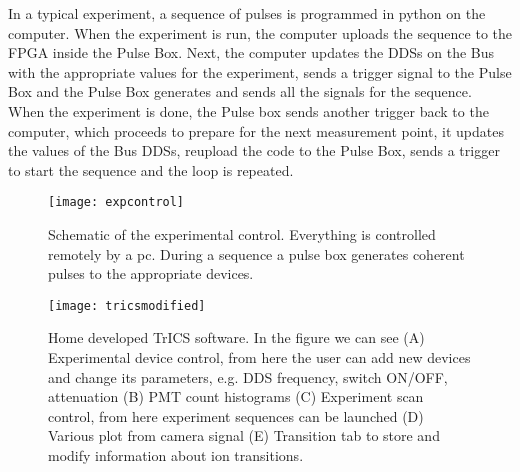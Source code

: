 In a typical experiment, a sequence of pulses is programmed in python on the computer. When the experiment is run, the computer uploads the sequence to the FPGA inside the Pulse Box. Next, the computer updates the DDSs on the Bus with the appropriate values for the experiment, sends a trigger signal to the Pulse Box and the Pulse Box generates and sends all the signals for the sequence. When the experiment is done, the Pulse box sends another trigger back to the computer, which proceeds to prepare for the next measurement point, it updates the values of the Bus DDSs, reupload the code to the Pulse Box, sends a trigger to start the sequence and the loop is repeated.

\begin{figure}
\centering
\texttt{[image: expcontrol]}
\caption{Schematic of the experimental control. Everything is controlled remotely by a pc. During a sequence a pulse box generates coherent pulses to the appropriate devices.}
\label{expcontrol}
\end{figure}

\begin{figure}
\centering
\texttt{[image: tricsmodified]}
\caption{Home developed TrICS software. In the figure we can see (A) Experimental device control, from here the user can add new devices and change its parameters, e.g. DDS frequency, switch ON/OFF, attenuation (B) PMT count histograms (C) Experiment scan control, from here experiment sequences can be launched (D) Various plot from camera signal (E) Transition tab to store and modify information about ion transitions.}
\label{trics}
\end{figure}
